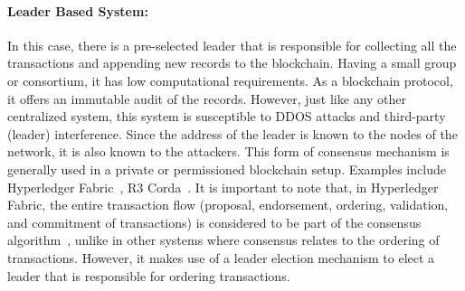 \paragraph{Leader Based System:}In this case, there is a pre-selected leader
that is responsible for collecting all the transactions and appending new
records to the blockchain. Having a small group or consortium, it has low
computational requirements. As a blockchain protocol, it offers an immutable
audit of the records. However, just like any other centralized system, this
system is susceptible to DDOS attacks and third-party (leader) interference.
Since the address of the leader is known to the nodes of the network, it is
also known to the attackers. This form of consensus mechanism is generally used
in a private or permissioned blockchain setup. Examples include Hyperledger
Fabric~\cite{androulaki2018hyperledger}, R3 Corda~\cite{brown2016corda}. It is
important to note that, in Hyperledger Fabric, the entire transaction flow
(proposal, endorsement, ordering, validation, and commitment of transactions)
is considered to be part of the consensus
algorithm~\cite{hyperledgerfabric,hyperledgerfabric2}, unlike in other systems
where consensus relates to the ordering of transactions. However, it makes use
of a leader election mechanism to elect a leader that is responsible for
ordering transactions. 
